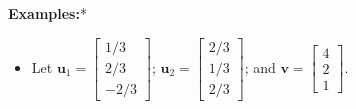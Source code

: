 \documentclass{article}
\begin{document}
\textbf{Examples:}*
\begin{itemize}
\item Let \(\mathbf{u}_1 = \begin{bmatrix} 1/3 \\ 2/3 \\ -2/3 \end{bmatrix}\); \(\mathbf{u}_2 = \begin{bmatrix} 2/3 \\ 1/3 \\ 2/3 \end{bmatrix}\); and \(\mathbf{v} = \begin{bmatrix} 4 \\ 2 \\ 1 \end{bmatrix}\).


\end{itemize}
\end{document}
